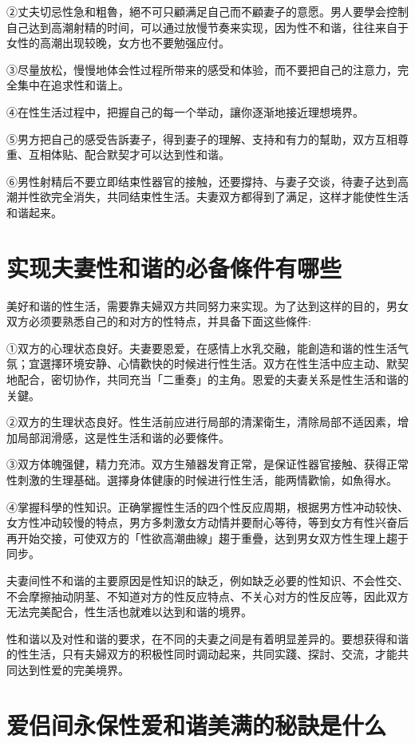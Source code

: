 \documentclass[12pt,UTF8]{ctexbook}
\begin{document}
②丈夫切忌性急和粗魯，絕不可只顧满足自己而不顧妻子的意愿。男人要學会控制自己达到高潮射精的时间，可以通过放慢节奏来实现，因为性不和谐，往往来自于女性的高潮出现较晚，女方也不要勉强应付。

③尽量放松，慢慢地体会性过程所带来的感受和体验，而不要把自己的注意力，完全集中在追求性和谐上。

④在性生活过程中，把握自己的每一个举动，讓你逐渐地接近理想境界。

⑤男方把自己的感受告訴妻子，得到妻子的理解、支持和有力的幫助，双方互相尊重、互相体贴、配合默契才可以达到性和谐。

⑥男性射精后不要立即结束性器官的接触，还要撐持、与妻子交谈，待妻子达到高潮并性欲完全消失，共同结束性生活。夫妻双方都得到了满足，这样才能使性生活和谐起来。

\section{实现夫妻性和谐的必备條件有哪些}

美好和谐的性生活，需要靠夫婦双方共同努力来实现。为了达到这样的目的，男女双方必须要熟悉自己的和对方的性特点，并具备下面这些條件:

①双方的心理状态良好。夫妻要恩爱，在感情上水乳交融，能創造和谐的性生活气氛；宜選擇环境安静、心情歡快的时候进行性生活。双方在性生活中应主动、默契地配合，密切协作，共同充当「二重奏」的主角。恩爱的夫妻关系是性生活和谐的关鍵。

②双方的生理状态良好。性生活前应进行局部的清潔衛生，清除局部不适因素，增加局部润滑感，这是性生活和谐的必要條件。

③双方体魄强健，精力充沛。双方生殖器发育正常，是保证性器官接触、获得正常性刺激的生理基础。選擇身体健康的时候进行性生活，能两情歡愉，如魚得水。

④掌握科學的性知识。正确掌握性生活的四个性反应周期，根据男方性冲动较快、女方性冲动较慢的特点，男方多刺激女方动情并要耐心等待，等到女方有性兴奋后再开始交接，可使双方的「性欲高潮曲線」趨于重疊，达到男女双方性生理上趨于同步。

夫妻间性不和谐的主要原因是性知识的缺乏，例如缺乏必要的性知识、不会性交、不会摩擦抽动阴茎、不知道对方的性反应特点、不关心对方的性反应等，因此双方无法完美配合，性生活也就难以达到和谐的境界。

性和谐以及对性和谐的要求，在不同的夫妻之间是有着明显差异的。要想获得和谐的性生活，只有夫婦双方的积极性同时调动起来，共同实踐、探討、交流，才能共同达到性爱的完美境界。

\section{爱侣间永保性爱和谐美满的秘訣是什么}
\end{document}
